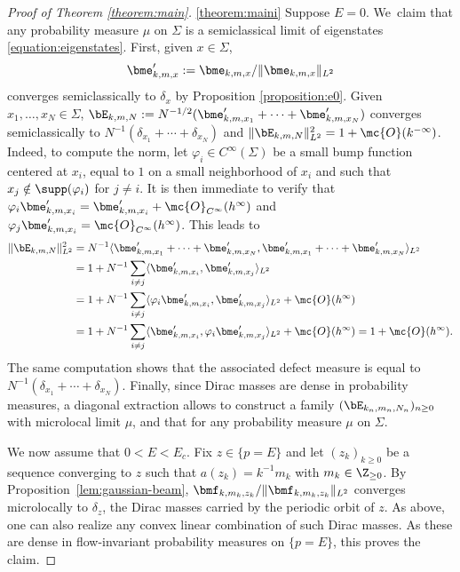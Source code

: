 \skpt
\begin{proof}[Proof of Theorem \ref{theorem:main}]

\eqref{theorem:maini}
Suppose $E=0$. We~claim that any probability measure $\mu$ on $\Sigma$ is a semiclassical limit of eigenstates \eqref{equation:eigenstates}. First, given $x \in \Sigma$,
\[
\bme'_{k,m,x} := \bme_{k,m,x}/\|\bme_{k,m,x}\|_{L^2}
\]
converges semiclassically to $\delta_x$ by Proposition \ref{proposition:e0}. Given $x_1,\dots, x_N \in \Sigma$, $\bE_{k,m,N} := N^{-1/2}(\bme'_{k,m,x_1} +\cdots+ \bme'_{k,m,x_N})$ converges semiclassically to $N^{-1}(\delta_{x_1}+\cdots+\delta_{x_N})$ and $\|\bE_{k,m,N}\|^2_{L^2} = 1 + \mc{O}(k^{-\infty})$. Indeed, to compute the norm, let $\varphi_{i} \in C^\infty(\Sigma)$ be a small bump function centered at $x_i$, equal to $1$ on a small neighborhood of $x_i$ and such that $x_j \notin \supp(\varphi_i)$ for $j \neq i$. It is then immediate to verify that $\varphi_i \bme'_{k,m,x_i} = \bme'_{k,m,x_i} + \mc{O}_{C^\infty}(h^\infty)$ and $\varphi_j \bme'_{k,m,x_i} = \mc{O}_{C^\infty}(h^\infty)$. This leads to
\[
\begin{split}
\|\bE_{k,m,N}\|^2_{L^2} & = N^{-1}\langle \bme'_{k,m,x_1} +\cdots+ \bme'_{k,m,x_N}, \bme'_{k,m,x_1} +\cdots+ \bme'_{k,m,x_N}\rangle_{L^2} \\
& = 1 + N^{-1} \sum_{i \neq j} \langle \bme'_{k,m,x_i},\bme'_{k,m,x_j}\rangle_{L^2} \\
& = 1 + N^{-1} \sum_{i \neq j} \langle \varphi_i \bme'_{k,m,x_i},\bme'_{k,m,x_j}\rangle_{L^2} + \mc{O}(h^\infty) \\
& = 1 + N^{-1} \sum_{i \neq j} \langle \bme'_{k,m,x_i},\varphi_i \bme'_{k,m,x_j}\rangle_{L^2} + \mc{O}(h^\infty) = 1 + \mc{O}(h^\infty).
\end{split}
\]
The same computation shows that the associated defect measure is equal to \hbox{$N^{-1}(\delta_{x_1}+\cdots+\delta_{x_N})$}. Finally, since Dirac masses are dense in probability measures, a diagonal extraction allows to construct a family $(\bE_{k_n,m_n,N_n})_{n \geq 0}$ with microlocal limit $\mu$, and that for any probability measure $\mu$ on $\Sigma$.

We now assume that $0 < E < E_c$. Fix $z \in \{p=E\}$ and let $(z_k)_{k \geq 0}$ be a sequence converging to $z$ such that $a(z_k) = k^{-1}m_k$ with $m_k \in \Z_{\geq 0}$. By Proposition~\ref{lem:gaussian-beam}, $\bmf_{k,m_k,z_k}/\|\bmf_{k,m_k,z_k}\|_{L^2}$ converges microlocally to $\delta_z$, the Dirac masses carried by the periodic orbit of $z$. As above, one can also realize any convex linear combination of such Dirac masses. As these are dense in flow-invariant probability measures on $\{p=E\}$, this proves the claim.


\end{proof}
